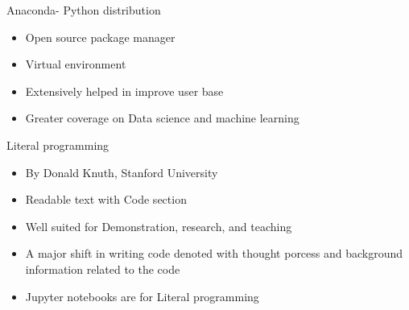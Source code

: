 \begin{frame}{Anaconda- Python distribution}
	\begin{beamerboxesrounded}{}
		\begin{itemize}
			\item Open source package manager
			\item Virtual environment 
			\item Extensively helped in improve user base
			\item Greater coverage on Data science and machine learning 
		\end{itemize}
	\end{beamerboxesrounded}
\end{frame}

\begin{frame}{Literal programming}
	\begin{beamerboxesrounded}{}
		\begin{itemize}
			\item By Donald Knuth, Stanford University
			\item Readable text with Code section
			\item Well suited for Demonstration, research, and teaching 
			\item A major shift in writing code denoted with thought porcess and background information related to the code 
			\item Jupyter notebooks are for Literal programming
		\end{itemize}
	\end{beamerboxesrounded}
\end{frame}

